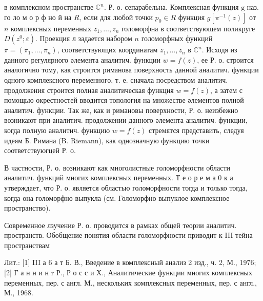 \documentclass[10pt]{article}
\begin{document}
в комплексном пространстве $\mathbb{C}^{n}$. Р. о. сепарабельна. Комплексная функция $\mathrm{g}$ наз. го ло м о р ф но й на $R$, если для любой точки $p_{0} \in R$ функция $g\left[\pi^{-1}(z)\right]$ от $n$ комплексных переменных $z_{1}, \ldots, z_{n}$ голоморфна в соответствующем поликруге $D\left(z^{0} ; \varepsilon\right)$. Проекция л задается набором $n$ голоморфных функций $\pi=\left(\pi_{1}, \ldots, \pi_{n}\right)$, соответствующих координатам $z_{1}, \ldots, z_{n}$ в $\mathbb{C}^{n}$. Исходя из данного регулярного әлемента аналитич. функции $w=f(z)$, ее Р. о. строится аналогично тому, как строится риманова поверхность данной аналитич. функции одного комплексного переменного, т. е. сначала посредством аналитич. продолжения строится полная аналитическая функция $w=f(z)$, а затем с помощью окрестностей вводится топология на множестве әлементов полной аналитич. функции. Так же, как и римановы поверхности, Р. о. неизбежно возникают при аналитич. продолжении данного әлемента аналитич. функции, когда полную аналитич. функцию $w=f(z)$ стремятся представить, следуя идеям Б. Римана (B. Riemann), как однозначную функцию точки соответствуюгцей Р. о.



В частности, Р. о. возникают как многолистные голоморфности области аналитич. функций многих комплексных переменных. Т е о р е м а 0 к а утверждает, что Р. о. является областью голоморфности тогда и только тогда, когда она голоморфно выпукла (см. Голоморфно выпуклое комплексное пространство).



Современное лзучение Р. о. проводится в рамках общей теории аналитич. пространств. Обобщение понятия области голоморфности приводит к III тейна пространствам



Лит.: [1] III а 6 а т Б. В., Введение в комплексный анализ 2 изд., ч. 2, М., 1976; [2] Г а н н и н $\mathrm{r}$ Р., Р о с с и Х., Аналитические функции многих комплексных переменных, пер. с англ. М., нескольких комплексных переменных, пер. с англ., М., 1968.
\end{document}
